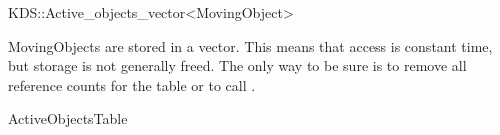 

\begin{ccRefClass}{KDS::Active_objects_vector<MovingObject>}  %


\ccDefinition
  

MovingObjects are stored in a vector. This means that access is constant
time, but storage is not generally freed. The only way to be sure is
to remove all reference counts for the table or to call .



\ccIsModel

ActiveObjectsTable




\end{ccRefClass}


